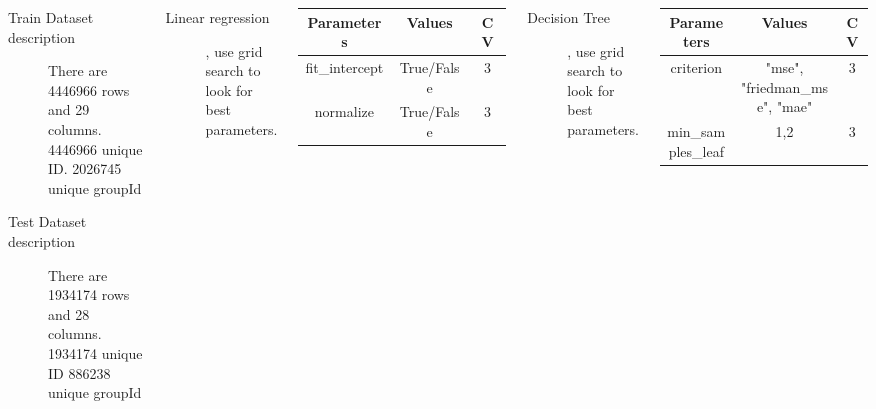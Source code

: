 \documentclass{tikzposter} %
\begin{document}
\begin{columns}
{\begin{description}
  	\item[Train Dataset description]
    There are 4446966 rows and 29
    columns.
    4446966 unique ID.
    2026745 unique groupId
    \item [Test Dataset description]
    There are 1934174 rows and 28
    columns.
    1934174 unique ID
    886238 unique groupId
\end{description}
}


{
\begin{description}
  	\item[Linear regression], use grid search to look for best parameters.
\end{description}
\vspace{.5cm}
\begin{tabular}{ c | c | c  }
    \toprule
    Parameters     &  Values    & CV     \\
    \midrule
    fit_intercept       &  True/False  &  3       \\

     normalize &  True/False   &  3     \\
     \bottomrule
\end{tabular}
\vspace{.2cm}
\begin{description}
    \item
    [Decision Tree], use grid search to look for best parameters.
\end{description}
\vspace{.5cm}
\begin{tabular}{ c | c | c }
    \toprule
    Parameters     &  Values    & CV     \\
    \midrule
    criterion       &  "mse", "friedman_mse", "mae"   &  3       \\

     min_samples_leaf &  1,2   &  3     \\
    \bottomrule
\end{tabular}
           

}
\end{columns}
\end{document}
